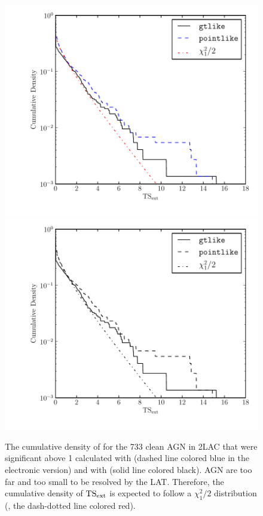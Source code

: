 \begin{figure}[htbp]
    \ifcolorfigure
      \includegraphics{source_plots/agn_color.pdf}
    \else
      \includegraphics{source_plots/agn_bw.pdf}
    \fi
    \caption{The cumulative density of \tsext for the 733 clean
    AGN in 2LAC that were significant above 1 \gev calculated with \pointlike (dashed line
    colored blue in the electronic version)
    and with \gtlike (solid line colored black).  AGN are too far
    and too small to be resolved by the LAT. Therefore, the cumulative
    density of $\mathrm{TS}_\mathrm{ext}$ is expected to follow a $\chi^2_1/2$ distribution
    (, the dash-dotted line colored
    red).
    }
  \end{figure}



